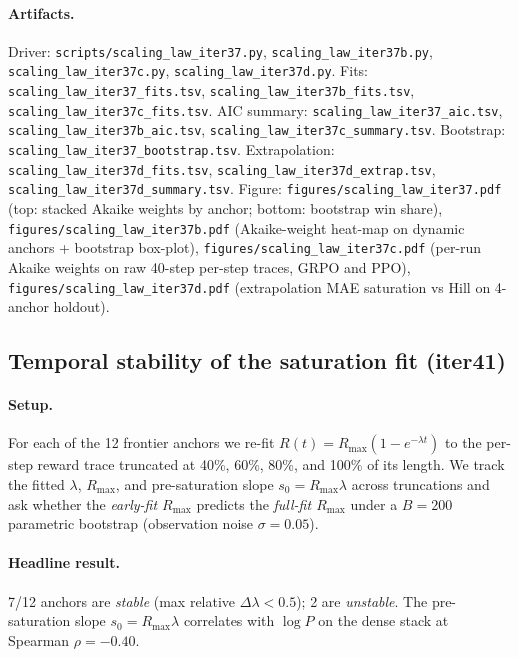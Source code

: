 \documentclass{article}
\begin{document}
\paragraph{Artifacts.}
Driver: \texttt{scripts/scaling\_law\_iter37.py},
\texttt{scaling\_law\_iter37b.py},
\texttt{scaling\_law\_iter37c.py},
\texttt{scaling\_law\_iter37d.py}.
Fits: \texttt{scaling\_law\_iter37\_fits.tsv},
\texttt{scaling\_law\_iter37b\_fits.tsv},
\texttt{scaling\_law\_iter37c\_fits.tsv}.
AIC summary: \texttt{scaling\_law\_iter37\_aic.tsv},
\texttt{scaling\_law\_iter37b\_aic.tsv},
\texttt{scaling\_law\_iter37c\_summary.tsv}.
Bootstrap: \texttt{scaling\_law\_iter37\_bootstrap.tsv}.
Extrapolation: \texttt{scaling\_law\_iter37d\_fits.tsv},
\texttt{scaling\_law\_iter37d\_extrap.tsv},
\texttt{scaling\_law\_iter37d\_summary.tsv}.
Figure: \texttt{figures/scaling\_law\_iter37.pdf} (top: stacked
Akaike weights by anchor; bottom: bootstrap win share),
\texttt{figures/scaling\_law\_iter37b.pdf} (Akaike-weight heat-map
on dynamic anchors + bootstrap box-plot),
\texttt{figures/scaling\_law\_iter37c.pdf} (per-run Akaike weights
on raw 40-step per-step traces, GRPO and PPO),
\texttt{figures/scaling\_law\_iter37d.pdf} (extrapolation MAE
saturation vs Hill on 4-anchor holdout).
 \subsection{Temporal stability of the saturation fit (iter41)}
\label{sec:scaling-law-iter41}
\paragraph{Setup.} For each of the 12 frontier anchors we re-fit $R(t)=R_{\max}(1-e^{-\lambda t})$ to the per-step reward trace truncated at 40\%, 60\%, 80\%, and 100\% of its length. We track the fitted $\lambda$, $R_{\max}$, and pre-saturation slope $s_0=R_{\max}\lambda$ across truncations and ask whether the \emph{early-fit $R_{\max}$} predicts the \emph{full-fit $R_{\max}$} under a $B=200$ parametric bootstrap (observation noise $\sigma=0.05$).
\paragraph{Headline result.}
 7/12 anchors are \textit{stable} (max relative $\Delta\lambda<0.5$); 2 are \textit{unstable}. The pre-saturation slope $s_0=R_{\max}\lambda$ correlates with $\log P$ on the dense stack at Spearman $\rho=-0.40$.
\end{document}
